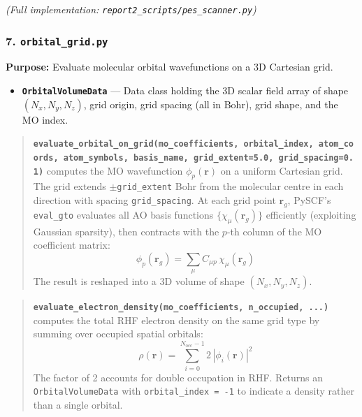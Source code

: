\documentclass[
  11pt,
]{report}
\providecommand{\tightlist}{%
  \setlength{\itemsep}{0pt}\setlength{\parskip}{0pt}}
\begin{document}
\emph{(Full implementation: \texttt{report2\_scripts/pes\_scanner.py})}

\subsubsection{\texorpdfstring{7.
\texttt{orbital\_grid.py}}{7. orbital\_grid.py}}\label{orbital_grid.py}

\textbf{Purpose:} Evaluate molecular orbital wavefunctions on a 3D
Cartesian grid.

\begin{itemize}
\tightlist
\item
  \textbf{\texttt{OrbitalVolumeData}} --- Data class holding the 3D
  scalar field array of shape \((N_x, N_y, N_z)\), grid origin, grid
  spacing (all in Bohr), grid shape, and the MO index.
\end{itemize}

\begin{quote}
\textbf{\texttt{evaluate\_orbital\_on\_grid(mo\_coefficients,\ orbital\_index,\ atom\_coords,\ atom\_symbols,\ basis\_name,\ grid\_extent=5.0,\ grid\_spacing=0.1)}}
computes the MO wavefunction \(\phi_p(\mathbf{r})\) on a uniform
Cartesian grid. The grid extends \(\pm\)\texttt{grid\_extent} Bohr from
the molecular centre in each direction with spacing
\texttt{grid\_spacing}. At each grid point \(\mathbf{r}_g\), PySCF's
\texttt{eval\_gto} evaluates all AO basis functions
\(\{\chi_\mu(\mathbf{r}_g)\}\) efficiently (exploiting Gaussian
sparsity), then contracts with the \(p\)-th column of the MO coefficient
matrix:
\[\phi_p(\mathbf{r}_g) = \sum_{\mu} C_{\mu p}\, \chi_\mu(\mathbf{r}_g)\]
The result is reshaped into a 3D volume of shape \((N_x, N_y, N_z)\).
\end{quote}

\begin{quote}
\textbf{\texttt{evaluate\_electron\_density(mo\_coefficients,\ n\_occupied,\ ...)}}
computes the total RHF electron density on the same grid type by summing
over occupied spatial orbitals:
\[\rho(\mathbf{r}) = \sum_{i=0}^{N_{\text{occ}}-1} 2\,|\phi_i(\mathbf{r})|^2\]
The factor of 2 accounts for double occupation in RHF. Returns an
\texttt{OrbitalVolumeData} with \texttt{orbital\_index\ =\ -1} to
indicate a density rather than a single orbital.
\end{quote}
\end{document}
